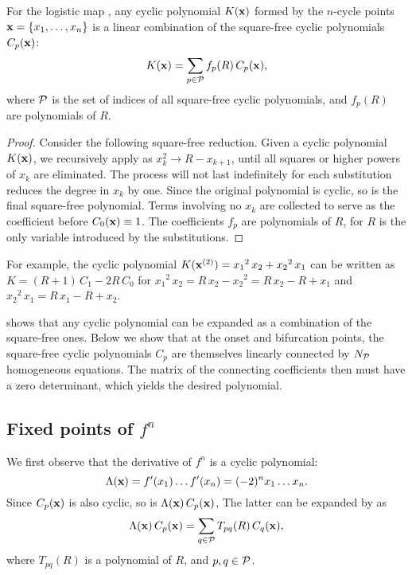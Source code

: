 \documentclass{ws-ijbc}
\begin{document}
\begin{theorem}
  For the logistic map ,
  any cyclic polynomial $K(\mathbf{x})$
  formed by the $n$-cycle points
  $\mathbf{x} = \{x_1, \ldots, x_n\}$
  is a linear combination of
  the square-free cyclic polynomials $C_p(\mathbf{x})$:
\[
  K(\mathbf{x}) = \sum_{p \in \mathcal P} f_p(R) \, C_p(\mathbf{x}),
\]
  where $\mathcal P$ %
  is the set of indices of all square-free cyclic polynomials,
  and $f_p(R)$ are polynomials of $R$.
  \label{thm:sqrfree}
\end{theorem}
%
%
\begin{proof}
Consider the following square-free reduction.
%
Given a cyclic polynomial $K(\mathbf{x})$,
  we recursively apply  as
  $x_k^2 \rightarrow R - x_{k+1}$,
  until all squares or higher powers of $x_k$ are eliminated.
The process will not last indefinitely
  for each substitution reduces the degree in $x_k$ %
  by one.
Since the original polynomial is cyclic,
  so is the final square-free polynomial.
Terms involving no $x_k$
  are collected to serve as the coefficient before $C_0(\mathbf{x}) \equiv 1$.
The coefficients $f_p$ are polynomials of $R$,
  for $R$ is the only variable introduced by the substitutions.
\end{proof}
%
%
For example, the cyclic polynomial
  $K(\mathbf{x}^{(2)}) = {x_1}^2 \, x_2 + {x_2}^2 \, x_1$
can be written as $K = (R + 1) \, C_{1} - 2 R \, C_0$
for
${x_1}^2 \, x_2 = R \, x_2 - {x_2}^2 = R \, x_2 - R + x_1$ and
${x_2}^2 \, x_1 = R \, x_1 - R + x_2$.


  shows that any cyclic polynomial can be expanded
  as a combination of the square-free ones.
Below we show that at the onset and bifurcation points,
  the square-free cyclic polynomials $C_p$ are themselves
  linearly connected by $N_\mathcal P$ homogeneous equations.
The matrix of the connecting coefficients then must have a zero determinant,
  which yields the desired polynomial.


\subsection{\label{sec:algo}Fixed points of $f^n$}


We first observe that the derivative of $f^n$
is a cyclic polynomial:
%
%
\begin{equation}
  \Lambda(\mathbf{x})
   = f'(x_1) \dots f'(x_n)
   = (-2)^n x_1 \dots x_n.
\label{eq:logder}
\end{equation}
%
%
Since $C_p(\mathbf{x})$ is also cyclic,
  so is $\Lambda(\mathbf{x}) \, C_p(\mathbf{x})$,
The latter can be expanded by  as
\begin{equation}
  \Lambda(\mathbf{x}) \, C_p(\mathbf{x}) = \sum_{q \in \mathcal P} T_{pq}(R) \, C_q(\mathbf{x}),
\label{eq:xcp0}
\end{equation}
where $T_{pq}(R)$ is a polynomial of $R$,
and $p, q \in \mathcal P$.
\end{document}
